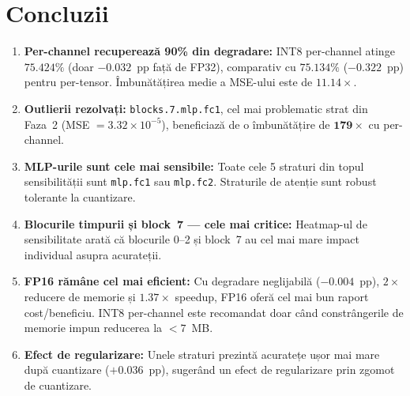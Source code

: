 \documentclass[12pt,a4paper]{article}
\begin{document}
\section{Concluzii}

\begin{enumerate}
  \item \textbf{Per-channel recuperează 90\% din degradare:}
    INT8 per-channel atinge $\mathbf{75.424\%}$ (doar $-0.032$~pp față de
    FP32), comparativ cu $75.134\%$ ($-0.322$~pp) pentru per-tensor.
    Îmbunătățirea medie a MSE-ului este de $\mathbf{11.14\times}$.

  \item \textbf{Outlierii rezolvați:} \texttt{blocks.7.mlp.fc1}, cel mai
    problematic strat din Faza~2 (MSE $= 3.32 \times 10^{-5}$), beneficiază
    de o îmbunătățire de $\mathbf{179\times}$ cu per-channel.

  \item \textbf{MLP-urile sunt cele mai sensibile:} Toate cele 5 straturi
    din topul sensibilității sunt \texttt{mlp.fc1} sau \texttt{mlp.fc2}.
    Straturile de atenție sunt robust tolerante la cuantizare.

  \item \textbf{Blocurile timpurii și block~7 --- cele mai critice:}
    Heatmap-ul de sensibilitate arată că blocurile 0--2 și block~7 au cel
    mai mare impact individual asupra acurateții.

  \item \textbf{FP16 rămâne cel mai eficient:} Cu degradare neglijabilă
    ($-0.004$~pp), $2\times$ reducere de memorie și $1.37\times$ speedup,
    FP16 oferă cel mai bun raport cost/beneficiu. INT8 per-channel este recomandat doar când
    constrângerile de memorie impun reducerea la $<7$~MB.

  \item \textbf{Efect de regularizare:} Unele straturi prezintă acuratețe
    ușor mai mare după cuantizare ($+0.036$~pp), sugerând un efect
    de regularizare prin zgomot de cuantizare.
\end{enumerate}
\end{document}
